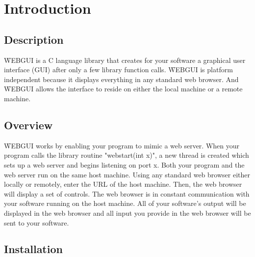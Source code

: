 \cleardoublepage
\setcounter{chapter}{0} %
\setcounter{section}{1} %

\chapter{Introduction}
\label{intro}
\setcounter{page}{1} 

\section{Description}

\f{WEBGUI} is a C language library that creates for your software a graphical user interface (GUI) after
only a few library function calls. \f{WEBGUI} is platform independent because it displays everything
in any standard web browser. And \f{WEBGUI} allows the interface to reside on either the local machine
or a remote machine.
 

\section{Overview}

\f{WEBGUI} works by enabling your program to mimic a web server. When your program calls the library
routine "webstart(int x)", a new thread is created which sets up a web server and begins listening on port x.  
Both your program and the web server run on the same host machine. Using any standard web browser either 
locally or remotely, enter the URL of the host machine. Then, the web browser will display a set of controls. 
The web browser is in constant communication with
your software running on the host machine. All of your software's output will be displayed in the web
browser and all input you provide in the web browser will be sent to your software.

\section{Installation}

